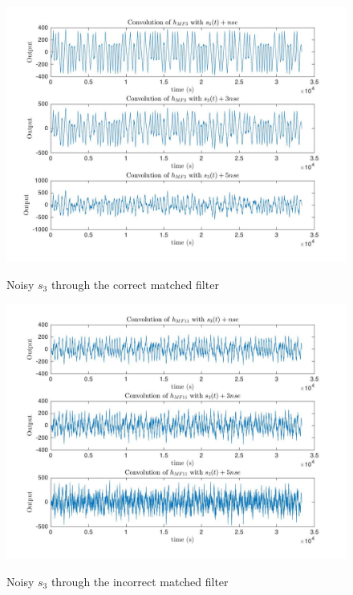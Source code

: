 \documentclass{article}
\begin{document}
\begin{figure}[!htb]
    \centering
    \begin{minipage}{.5\textwidth}
        \centering
        \includegraphics[width=1.0\linewidth, height=0.2\textheight]{s3h3.jpg}

        \label{fig:prob1_6_2}
    \end{minipage}
    \caption{Noisy $s_3$ through the correct matched filter}
\end{figure}

\begin{figure}[!htb]
    \centering
    \begin{minipage}{.5\textwidth}
        \centering
        \includegraphics[width=1.0\linewidth, height=0.2\textheight]{s3h11.jpg}

        \label{fig:prob1_6_2}
    \end{minipage}
    \caption{Noisy $s_3$ through the incorrect matched filter}
\end{figure}
\end{document}
